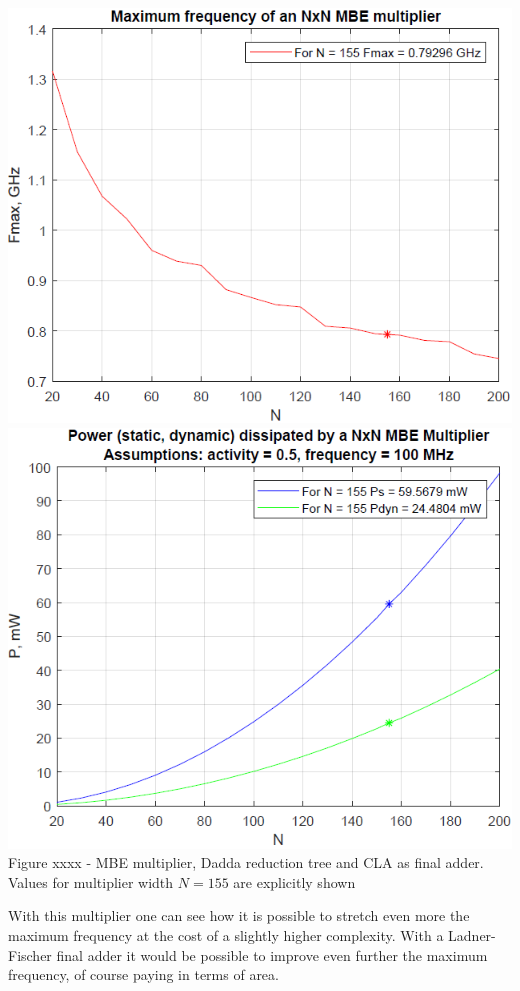 \documentclass[11pt]{article} %
\begin{document}
\begin{center}
\includegraphics[scale=.48]{fmax_mbe.PNG}
\includegraphics[scale=.48]{power_mbe.PNG}
\small{Figure xxxx - MBE multiplier, Dadda reduction tree and CLA as final adder. Values for multiplier width $N=155$ are explicitly shown}
\end{center}
\vspace{1em}
With this multiplier one can see how it is possible to stretch even more the maximum frequency at the cost of a slightly higher complexity. With a Ladner-Fischer final adder it would be possible to improve even further the maximum frequency, of course paying in terms of area.
\vspace{2em}
\newpage
\end{document}
